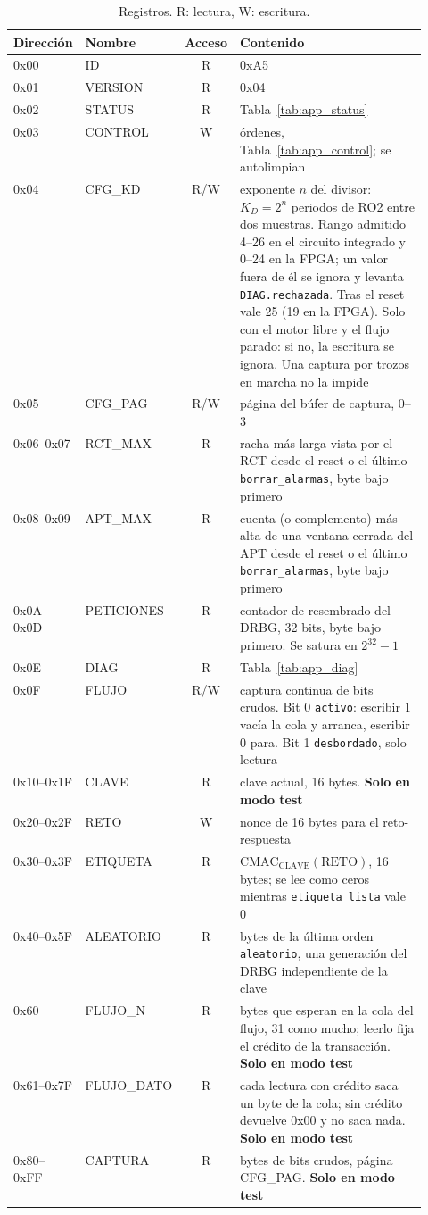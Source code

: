 \begin{table}[htbp]
\centering\small
\caption{Registros. R: lectura, W: escritura.}
\label{tab:app_regs}
\begin{tabular}{@{}llc>{\raggedright\arraybackslash}p{0.54\linewidth}@{}}
\toprule
Dirección & Nombre & Acceso & Contenido \\
\midrule
0x00 & ID & R & 0xA5 \\
0x01 & VERSION & R & 0x04 \\
0x02 & STATUS & R & Tabla~\ref{tab:app_status} \\
0x03 & CONTROL & W & órdenes, Tabla~\ref{tab:app_control}; se autolimpian \\
0x04 & CFG\_KD & R/W & exponente $n$ del divisor: $K_D = 2^{n}$ periodos de
  RO2 entre dos muestras. Rango admitido 4--26 en el circuito integrado y
  0--24 en la \ac{FPGA}; un valor fuera de él se ignora y levanta
  \texttt{DIAG.rechazada}. Tras el reset vale 25 (19 en la \ac{FPGA}).
  Solo con el motor libre y el flujo parado: si no, la escritura se
  ignora. Una captura por trozos en marcha no la impide \\
0x05 & CFG\_PAG & R/W & página del búfer de captura, 0--3 \\
0x06--0x07 & RCT\_MAX & R & racha más larga vista por el \ac{RCT} desde el
  reset o el último \texttt{borrar\_alarmas}, byte bajo primero \\
0x08--0x09 & APT\_MAX & R & cuenta (o complemento) más alta de una ventana
  cerrada del \ac{APT} desde el reset o el último
  \texttt{borrar\_alarmas}, byte bajo primero \\
0x0A--0x0D & PETICIONES & R & contador de resembrado del \ac{DRBG}, 32 bits,
  byte bajo primero. Se satura en $2^{32}-1$ \\
0x0E & DIAG & R & Tabla~\ref{tab:app_diag} \\
0x0F & FLUJO & R/W & captura continua de bits crudos. Bit 0
  \texttt{activo}: escribir 1 vacía la cola y arranca, escribir 0 para.
  Bit 1 \texttt{desbordado}, solo lectura \\
0x10--0x1F & CLAVE & R & clave actual, 16 bytes. \textbf{Solo en modo test} \\
0x20--0x2F & RETO & W & nonce de 16 bytes para el reto-respuesta \\
0x30--0x3F & ETIQUETA & R & $\mathrm{CMAC}_{\text{CLAVE}}(\text{RETO})$, 16
  bytes; se lee como ceros mientras \texttt{etiqueta\_lista} vale 0 \\
0x40--0x5F & ALEATORIO & R & 32 bytes de la última orden \texttt{aleatorio},
  una generación del \ac{DRBG} independiente de la clave \\
0x60 & FLUJO\_N & R & bytes que esperan en la cola del flujo, 31 como
  mucho; leerlo fija el crédito de la transacción. \textbf{Solo en modo
  test} \\
0x61--0x7F & FLUJO\_DATO & R & cada lectura con crédito saca un byte de la
  cola; sin crédito devuelve 0x00 y no saca nada. \textbf{Solo en modo
  test} \\
0x80--0xFF & CAPTURA & R & 128 bytes de bits crudos, página CFG\_PAG.
  \textbf{Solo en modo test} \\
\bottomrule
\end{tabular}
\end{table}
